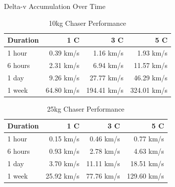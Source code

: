\documentclass[aspectratio=169]{beamer}
\begin{document}
\begin{frame}{Delta-v Accumulation Over Time}
\begin{table}
\centering
\caption{10kg Chaser Performance}
\small
\begin{tabular}{lrrr}
\toprule
\textbf{Duration} & \textbf{1 C} & \textbf{3 C} & \textbf{5 C} \\
\midrule
1 hour & 0.39 km/s & 1.16 km/s & 1.93 km/s \\
6 hours & 2.31 km/s & 6.94 km/s & 11.57 km/s \\
1 day & 9.26 km/s & 27.77 km/s & 46.29 km/s \\
1 week & 64.80 km/s & 194.41 km/s & 324.01 km/s \\
\bottomrule
\end{tabular}
\end{table}

\vspace{0.3cm}

\begin{table}
\centering
\caption{25kg Chaser Performance}
\small
\begin{tabular}{lrrr}
\toprule
\textbf{Duration} & \textbf{1 C} & \textbf{3 C} & \textbf{5 C} \\
\midrule
1 hour & 0.15 km/s & 0.46 km/s & 0.77 km/s \\
6 hours & 0.93 km/s & 2.78 km/s & 4.63 km/s \\
1 day & 3.70 km/s & 11.11 km/s & 18.51 km/s \\
1 week & 25.92 km/s & 77.76 km/s & 129.60 km/s \\
\bottomrule
\end{tabular}
\end{table}
\end{frame}
\end{document}
